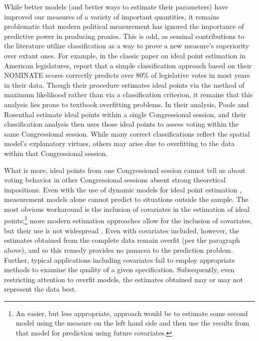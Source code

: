 While better models (and better ways to estimate their parameters) have improved our measures of a variety of important quantities, it remains problematic that modern political measurement has ignored the importance of predictive power in producing proxies. 
This is odd, as seminal contributions to the literature utilize classification as a way to prove a new measure's superiority over extant ones. For example, in the classic paper on ideal point estimation in American legislatures, \citet[Table 3]{poole1985} report that a simple classification approach based on their NOMINATE scores correctly predicts over 80\% of legislative votes in most years in their data. Though their procedure estimates ideal points via the method of maximum likelihood rather than via a classification criterion, it remains that this analysis lies prone to textbook overfitting problems. 
In their analysis, Poole and Rosenthal estimate ideal points within a single Congressional session, and their classification analysis then uses those ideal points to assess voting within the same Congressional session. 
While many correct classifications reflect the spatial model's explanatory virtues, others may arise due to overfitting to the data within that Congressional session.

What is more, ideal points from one Congressional session cannot tell us about voting behavior in other Congressional sessions absent strong theoretical impositions. 
Even with the use of dynamic models for ideal point estimation \citep{martin2002}, measurement models alone cannot predict to situations outside the sample. 
The most obvious workaround is the inclusion of covariates in the estimation of ideal points;\footnote{An easier, but less appropriate, approach would be to estimate some second model using the measure on the left hand side and then use the results from that model for prediction using future covariates.} more modern estimation approaches \citep{clinton2004} allow for the inclusion of covariates, but their use is not widespread \citep[for an exception, see][]{bailey2001}. 
Even with covariates included, however, the estimates obtained from the complete data remain overfit (per the paragraph above), and so this remedy provides no panacea to the prediction problem. 
Further, typical applications including covariates fail to employ appropriate methods to examine the quality of a given specification. 
Subsequently, even restricting attention to overfit models, the estimates obtained may or may not represent the data best.

